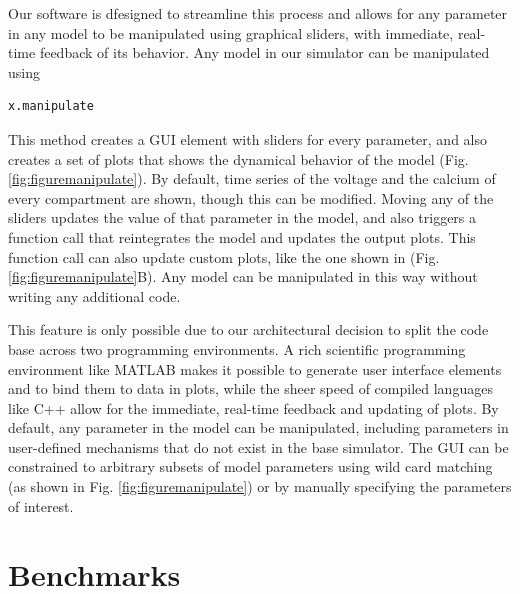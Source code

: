 \documentclass{frontiersSCNS} %
\begin{document}
Our software is dfesigned to streamline this process and allows for any parameter in any model to be manipulated using graphical sliders, with immediate, real-time feedback of its behavior. Any model in our simulator can be manipulated using

\begin{lstlisting}[style=Matlab-editor]
x.manipulate 
\end{lstlisting}

This method creates a GUI element with sliders for every parameter, and also creates a set of plots that shows the dynamical behavior of the model (Fig. \ref{fig:figuremanipulate}). By default, time series of the voltage and the calcium of every compartment are shown, though this can be modified. Moving any of the sliders updates the value of that parameter in the model, and also triggers a function call that reintegrates the model and updates the output plots. This function call can also update custom plots, like the one shown in (Fig. \ref{fig:figuremanipulate}B). Any model can be manipulated in this way without writing any additional code. 

This feature is only possible due to our architectural decision to split the code base across two programming environments. A rich scientific programming environment like MATLAB makes it possible to generate user interface elements and to bind them to data in plots, while the sheer speed of compiled languages like C++ allow for the immediate, real-time feedback and updating of plots. By default, any parameter in the model can be manipulated, including parameters in user-defined mechanisms that do not exist in the base simulator. The GUI can be constrained to arbitrary subsets of model parameters using wild card matching (as shown in Fig. \ref{fig:figuremanipulate}) or by manually specifying the parameters of interest. 



%
%
%
%
%
%

\section{Benchmarks}
\label{benchmarks}
\end{document}

